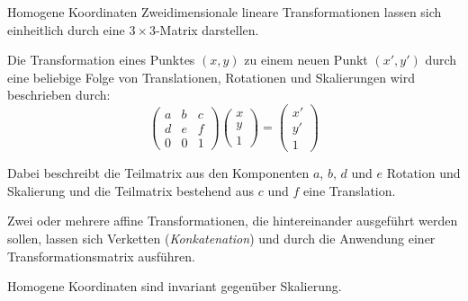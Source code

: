 \begin{defi}{Homogene Koordinaten}
    Zweidimensionale lineare Transformationen lassen sich einheitlich durch eine $3 \times 3$-Matrix darstellen.

    Die Transformation eines Punktes $(x, y)$ zu einem neuen Punkt $(x', y')$ durch eine beliebige Folge von Translationen, Rotationen und Skalierungen wird beschrieben durch:
    \[
        \begin{pmatrix}
            a & b & c \\
            d & e & f \\
            0 & 0 & 1
        \end{pmatrix}
        \begin{pmatrix}
            x \\ y \\ 1
        \end{pmatrix}
        =
        \begin{pmatrix}
            x' \\ y' \\ 1
        \end{pmatrix}
    \]

    Dabei beschreibt die Teilmatrix aus den Komponenten $a$, $b$, $d$ und $e$ Rotation und Skalierung und die Teilmatrix bestehend aus $c$ und $f$ eine Translation.

    Zwei oder mehrere affine Transformationen, die hintereinander ausgeführt werden sollen, lassen sich Verketten (\emph{Konkatenation}) und durch die Anwendung einer Transformationsmatrix ausführen.

    Homogene Koordinaten sind invariant gegenüber Skalierung.
\end{defi}


